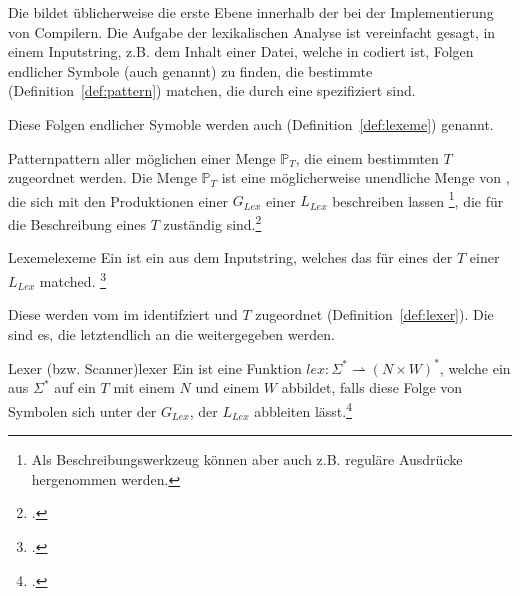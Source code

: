 Die  bildet üblicherweise die erste Ebene innerhalb der  bei der Implementierung von Compilern. Die Aufgabe der lexikalischen Analyse ist vereinfacht gesagt, in einem Inputstring, z.B. dem Inhalt einer Datei, welche in  codiert ist, Folgen endlicher Symbole (auch  genannt) zu finden, die bestimmte  (Definition~\ref{def:pattern}) matchen, die durch eine  spezifiziert sind.

Diese Folgen endlicher Symoble werden auch  (Definition~\ref{def:lexeme}) genannt.

\begin{Definition}{Pattern}{pattern}
   aller möglichen  einer Menge $\mathbb{P}_{T}$, die einem bestimmten  $T$ zugeordnet werden.
  Die Menge $\mathbb{P}_{T}$ ist eine möglicherweise unendliche Menge von , die sich mit den Produktionen einer  ${G}_{Lex}$ einer  ${L}_{Lex}$ beschreiben lassen \footnote{Als Beschreibungswerkzeug können aber auch z.B. reguläre Ausdrücke hergenommen werden.}, die für die Beschreibung eines  $T$ zuständig sind.\footcite{noauthor_what_nodate}
\end{Definition}

\begin{Definition}{Lexeme}{lexeme}
  Ein  ist ein  aus dem Inputstring, welches das  für eines der  $T$ einer  ${L}_{Lex}$ matched.
\footcite{noauthor_what_nodate}
\end{Definition}

Diese  werden vom  im  identifziert und  $T$ zugeordnet (Definition~\ref{def:lexer}). Die  sind es, die letztendlich an die  weitergegeben werden.

\begin{Definition}{Lexer (bzw. Scanner)}{lexer}
  Ein  ist eine  Funktion \hspace{0.2cm}$lex: \Sigma^{*} \rightharpoonup (N \times W)^{*}$, welche ein  aus $\Sigma^{*}$ auf ein  $T$ mit einem  $N$ und einem  $W$ abbildet, falls diese Folge von Symbolen sich unter der  ${G}_{Lex}$, der  ${L_{Lex}}$ abbleiten lässt.\footcite{noauthor_lecture-notes-2021_2022}
\end{Definition}


